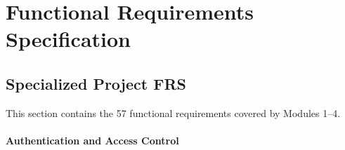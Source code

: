 \section{Functional Requirements Specification}
\label{appendix:fr}

\begingroup
\small
\renewcommand{\arraystretch}{1.12}


\subsection{Specialized Project FRS}
This section contains the 57 functional requirements covered by Modules 1--4.

\paragraph{Authentication and Access Control}

